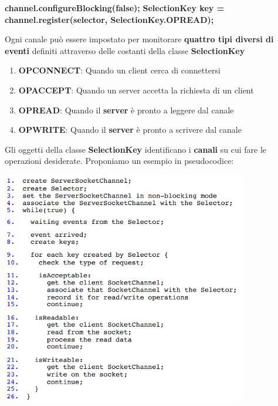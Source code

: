 \documentclass[12pt]{article}
\begin{document}
\begin{center}
    \textbf{channel.configureBlocking(false);}\newline
    \textbf{SelectionKey key = channel.register(selector, SelectionKey.OP\textunderscore READ);}
\end{center}
Ogni canale può essere impostato per monitorare \textbf{quattro tipi diversi di eventi} definiti attraverso delle costanti della classe \textbf{SelectionKey}
\begin{enumerate}
    \item \textbf{OP\textunderscore CONNECT}: Quando un client cerca di connettersi
    \item \textbf{OP\textunderscore ACCEPT}: Quando un server accetta la richiesta di un client
    \item \textbf{OP\textunderscore READ}: Quando il \textbf{server} è pronto a leggere dal canale
    \item \textbf{OP\textunderscore WRITE}: Quando il \textbf{server} è pronto a scrivere dal canale
\end{enumerate}
Gli oggetti della classe \textbf{SelectionKey} identificano i \textbf{canali} su cui fare le operazioni desiderate. \newline
Proponiamo un esempio in pseudocodice:
\begin{center}
    \includegraphics[width = 0.80\textwidth]{Images/41.PNG}
\end{center}
\end{document}
